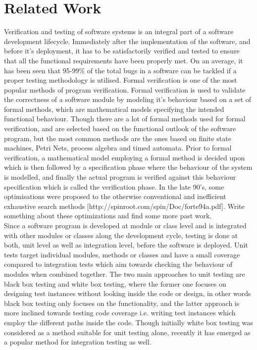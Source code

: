 

\section{Related Work}

Verification and testing of software systems is an integral part of a software development lifecycle. Immediately after the implementation of the software, and before it's deployment, it has to be satisfactorily verified and tested to ensure that all the functional requirements have been properly met. On an average, it has been seen that 95-99\% of the total bugs in a software can be tackled if a proper testing methodology is utilised. Formal verification is one of the most popular methods of program verification. Formal verification is used to validate the correctness of a software module by modeling it's behaviour based on a set of formal methods, which are mathematical models specifying the intended functional behaviour. Though there are a lot of formal methods used for formal verification, and are selected based on the functional outlook of the software program, but the most common methods are the ones based on finite state machines, Petri Nets, process algebra and timed automata. Prior to formal verification, a mathematical model employing a formal method is decided upon which is then followed by a specification phase where the behaviour of the system is modelled, and finally the actual program is verified against this behaviour specification which is called the verification phase. In the late 90's, some optimisations were proposed to the otherwise conventional and inefficient exhaustive search methods [http://spinroot.com/spin/Doc/forte94a.pdf]. Write something about these optimizations and find some more past work.\\

Since a software program is developed at module or class level and is integrated with other modules or classes along the development cycle, testing is done at both, unit level as well as integration level, before the software is deployed. Unit tests target individual modules, methods or classes and have a small coverage compared to integration tests which aim towards checking the behaviour of modules when combined together. The two main approaches to unit testing are black box testing and white box testing, where the former one focuses on designing test instances without looking inside the code or design, in other words black box testing only focuses on the functionality, and the latter approach is more inclined towards testing code coverage i.e. writing test instances which employ the different paths inside the code. Though initially white box testing was considered as a method suitable for unit testing alone, recently it has emerged as a popular method for integration testing as well.